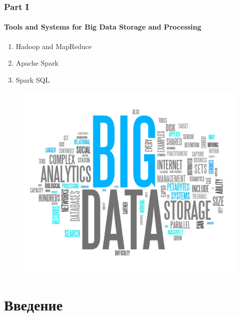 \documentclass[9pt,aspectratio=169]{beamer}
\begin{document}
\begin{frame}
    \frametitle{Part I}
    \framesubtitle{Tools and Systems for Big Data Storage and Processing}
    
    \begin{minipage}{0.5\textwidth}
        \begin{enumerate}
            \itemsep1.3em
            \item Hadoop and MapReduce
            \item Apache Spark
            \item Spark SQL
        \end{enumerate}
    \end{minipage} \hfill
    \begin{minipage}{0.49\textwidth}
        \begin{figure}
            \includegraphics[width=1.0\linewidth]{images/big_data_image.jpg}
        \end{figure}
    \end{minipage}
    
\end{frame}

\section{Введение}
\end{document}
